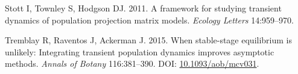 \documentclass[
  12pt,
  letterpaper,
]{book}
\newlength{\cslhangindent}
\newenvironment{CSLReferences}[2] %
 {\begin{list}{}{%
  \setlength{\itemindent}{0pt}
  \setlength{\leftmargin}{0pt}
  \setlength{\parsep}{0pt}
  \ifodd #1
   \setlength{\leftmargin}{\cslhangindent}
   \setlength{\itemindent}{-1\cslhangindent}
  \fi
  \setlength{\itemsep}{#2\baselineskip}}}
 {\end{list}}
\begin{document}
\begin{CSLReferences}{1}{0}
Stott I, Townley S, Hodgson DJ. 2011. A framework for studying transient
dynamics of population projection matrix models. \emph{Ecology Letters}
14:959--970.

Tremblay R, Raventos J, Ackerman J. 2015. When stable-stage equilibrium
is unlikely: Integrating transient population dynamics improves
asymptotic methods. \emph{Annals of Botany} 116:381--390. DOI:
\href{https://doi.org/10.1093/aob/mcv031}{10.1093/aob/mcv031}.

\end{CSLReferences}


\backmatter
\end{document}
